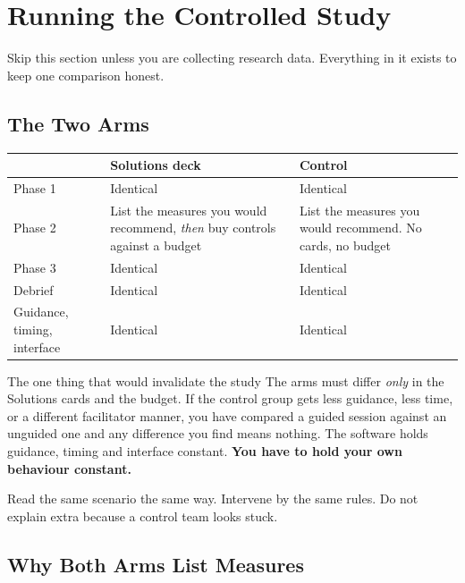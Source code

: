 \section{Running the Controlled Study}
\label{sec:study}

Skip this section unless you are collecting research data. Everything in it
exists to keep one comparison honest.

\subsection{The Two Arms}

\begin{center}
\small
\begin{tabularx}{\textwidth}{@{}l X X@{}}
\toprule
& \textbf{Solutions deck} & \textbf{Control} \\
\midrule
Phase 1 & Identical & Identical \\
Phase 2 & List the measures you would recommend, \emph{then} buy controls
against a budget & List the measures you would recommend. No cards, no budget \\
Phase 3 & Identical & Identical \\
Debrief & Identical & Identical \\
Guidance, timing, interface & Identical & Identical \\
\bottomrule
\end{tabularx}
\end{center}

\begin{intervene}{The one thing that would invalidate the study}
The arms must differ \emph{only} in the Solutions cards and the budget. If the
control group gets less guidance, less time, or a different facilitator manner,
you have compared a guided session against an unguided one and any difference you
find means nothing. The software holds guidance, timing and interface constant.
\textbf{You have to hold your own behaviour constant.}

Read the same scenario the same way. Intervene by the same rules. Do not explain
extra because a control team looks stuck.
\end{intervene}

\subsection{Why Both Arms List Measures}

